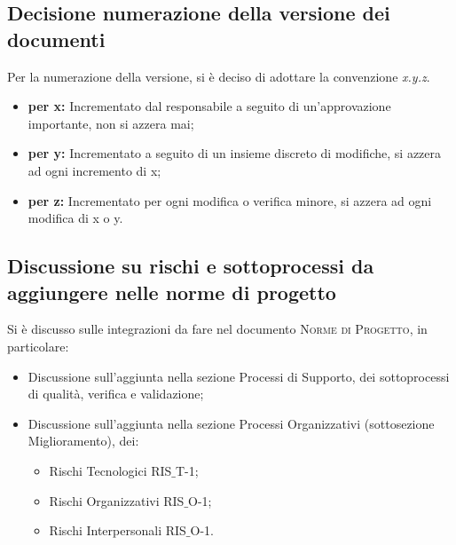 \subsection{Decisione numerazione della versione dei documenti}
Per la numerazione della versione, si è deciso di adottare la convenzione \textit{x.y.z}.\\
\begin{itemize}
	\item \textbf{{per x:}} Incrementato dal responsabile a seguito di un’approvazione importante, non si azzera mai;
	\item \textbf{{per y:}} Incrementato a seguito di un insieme discreto di modifiche, si azzera ad ogni incremento di x;
	\item \textbf{{per z:}} Incrementato per ogni modifica o verifica minore, si azzera ad ogni modifica di x o y.
\end{itemize}
\subsection{Discussione su rischi e sottoprocessi da aggiungere nelle norme di progetto}
Si è discusso sulle integrazioni da fare nel documento \textsc{Norme di Progetto}, in particolare:
\begin{itemize}
	\item Discussione sull'aggiunta nella sezione Processi di Supporto, dei sottoprocessi di qualità, verifica e validazione;
	\item Discussione sull'aggiunta nella sezione Processi Organizzativi (sottosezione Miglioramento), dei:
	\begin{itemize}
		\item Rischi Tecnologici RIS$\_$T-1;
		\item Rischi Organizzativi RIS$\_$O-1;
		\item Rischi Interpersonali RIS$\_$O-1.
	\end{itemize}
\end{itemize}

